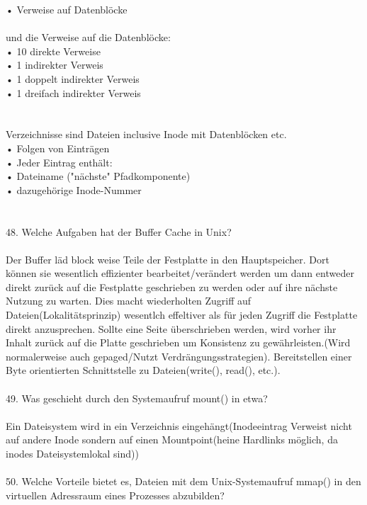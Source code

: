 \documentclass{article}
\newcommand\tab[1][1cm]{\hspace*{#1}}
\begin{document}
\tab • Verweise auf Datenblöcke\\
\\
und die Verweise auf die Datenbl\"ocke:\\
\tab • 10 direkte Verweise\\
\tab • 1 indirekter Verweis\\
\tab • 1 doppelt indirekter Verweis\\
\tab • 1 dreifach indirekter Verweis\\
\\
\\
Verzeichnisse sind Dateien inclusive Inode mit Datenblöcken etc.\\
\tab • Folgen von Einträgen\\
\tab • Jeder Eintrag enthält:\\
\tab • Dateiname ("nächste" Pfadkomponente)\\
\tab • dazugeh\"orige Inode-Nummer\\
\\
\\
48. Welche Aufgaben hat der Buffer Cache in Unix?
\\
\\
Der Buffer l\"ad block weise Teile der Festplatte in den Hauptspeicher. Dort k\"onnen sie wesentlich effizienter bearbeitet/ver\"andert werden um dann entweder direkt zur\"uck auf die Festplatte geschrieben zu werden oder auf ihre n\"achste Nutzung zu warten. Dies macht wiederholten Zugriff auf Dateien(Lokalit\"atsprinzip) wesentlch effeltiver als f\"ur jeden Zugriff die Festplatte direkt anzusprechen. Sollte eine Seite \"uberschrieben werden, wird vorher ihr Inhalt zur\"uck auf die Platte geschrieben um Konsistenz zu gew\"ahrleisten.(Wird normalerweise auch gepaged/Nutzt Verdr\"angungsstrategien).
Bereitstellen einer Byte orientierten Schnittstelle zu Dateien(write(), read(), etc.).
\\
\\
49. Was geschieht durch den Systemaufruf mount() in etwa?
\\
\\
Ein Dateisystem wird in ein Verzeichnis eingeh\"angt(Inodeeintrag Verweist nicht auf andere Inode sondern auf einen Mountpoint(heine Hardlinks m\"oglich, da inodes Dateisystemlokal sind))
\\
\\
50. Welche Vorteile bietet es, Dateien mit dem Unix-Systemaufruf mmap() in den virtuellen
Adressraum eines Prozesses abzubilden?
\\
\\
\end{document}
